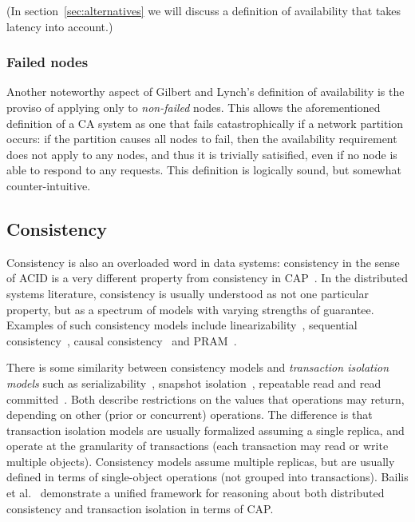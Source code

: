 \documentclass[a4paper,twocolumn,10pt]{article}
\begin{document}
(In section~\ref{sec:alternatives} we will discuss a definition of availability that takes latency
into account.)

\subsubsection{Failed nodes}\label{sec:failed-node-exception}

Another noteworthy aspect of Gilbert and Lynch's definition of availability is the proviso of
applying only to \emph{non-failed} nodes. This allows the aforementioned definition of a CA system
as one that fails catastrophically if a network partition occurs: if the partition causes all nodes
to fail, then the availability requirement does not apply to any nodes, and thus it is trivially
satisified, even if no node is able to respond to any requests. This definition is logically sound,
but somewhat counter-intuitive.

\subsection{Consistency}\label{sec:consistency}

Consistency is also an overloaded word in data systems: consistency in the sense of ACID is a very
different property from consistency in CAP~\cite{Brewer2012ba}. In the distributed systems
literature, consistency is usually understood as not one particular property, but as a spectrum of
models with varying strengths of guarantee. Examples of such consistency models include
linearizability~\cite{Herlihy1990jq}, sequential consistency~\cite{Lamport1979ky}, causal
consistency~\cite{Ahamad1995gl} and PRAM~\cite{Lipton1988uh}.

There is some similarity between consistency models and \emph{transaction isolation models} such as
serializability~\cite{Bernstein1987va}, snapshot isolation~\cite{Berenson1995kj}, repeatable read
and read committed~\cite{Adya1999tx, Gray1976us}. Both describe restrictions on the values that
operations may return, depending on other (prior or concurrent) operations. The difference is that
transaction isolation models are usually formalized assuming a single replica, and operate at the
granularity of transactions (each transaction may read or write multiple objects). Consistency
models assume multiple replicas, but are usually defined in terms of single-object operations (not
grouped into transactions). Bailis et al.~\cite{Bailis2014vc} demonstrate a unified framework for
reasoning about both distributed consistency and transaction isolation in terms of CAP.
\end{document}
